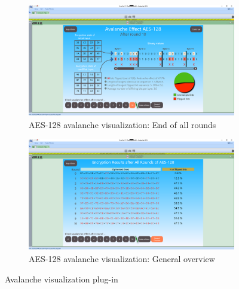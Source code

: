 \begin{figure}
\centering
\begin{subfigure}{\textwidth}
  \centering
  \includegraphics[width=\textwidth]{figures/ct2/avalanche.png}
  \caption{AES-128 avalanche visualization: End of all rounds}
  \label{fig:avalanche.roundsend}
\end{subfigure}
\begin{subfigure}{\textwidth}
  \centering
  \includegraphics[width=\textwidth]{figures/ct2/avalanche2.png}
  \caption{AES-128 avalanche visualization: General overview}
  \label{fig:avalanche.overview}
\end{subfigure}
\caption{Avalanche visualization plug-in}
\label{fig:avalanche}
\end{figure}